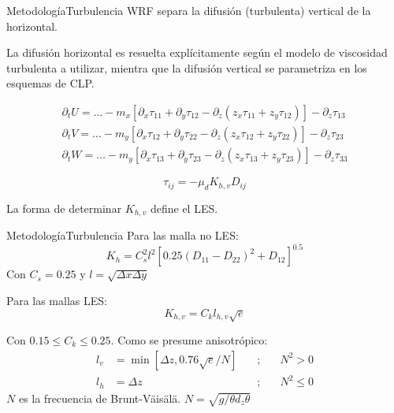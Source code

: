 \documentclass[mathserif]{beamer}
\begin{document}
\begin{frame}{Metodología}{Turbulencia}
WRF separa la difusión (turbulenta) vertical de la horizontal. 

La difusión horizontal es resuelta explícitamente según el modelo de viscosidad turbulenta a utilizar, mientra que la difusión vertical se parametriza en los esquemas de CLP.

{\small
\begin{eqnarray}
\partial_t U = \ldots - m_x[\partial_x\tau_{11}+\partial_y\tau_{12}-\partial_z(z_x\tau_{11}+z_y\tau_{12})]-\partial_z\tau_{13} \\
\partial_t V = \ldots - m_y[\partial_x\tau_{12}+\partial_y\tau_{22}-\partial_z(z_x\tau_{12}+z_y\tau_{22})]-\partial_z\tau_{23} \\
\partial_t W = \ldots - m_y[\partial_x\tau_{13}+\partial_y\tau_{23}-\partial_z(z_x\tau_{13}+z_y\tau_{23})]-\partial_z\tau_{33}
\end{eqnarray}}

\begin{equation}
\tau_{ij} = -\mu_d K_{h,v}D_{ij}
\end{equation}

La forma de determinar $K_{h,v}$ define el LES.
\end{frame}

\begin{frame}{Metodología}{Turbulencia}
Para las malla no LES:
\begin{equation}
K_h = C_s^2 l^2[0.25(D_{11}-D_{22})^2+D_{12}]^{0.5}
\end{equation}
Con $C_s=0.25$ y $l=\sqrt{\Delta x\Delta y}$

\bigskip
Para las mallas LES:
\begin{equation}
K_{h,v} = C_k l_{h,v}\sqrt{e}
\end{equation}

Con $0.15\leq C_k \leq 0.25$. Como se presume anisotrópico:
\begin{align}
l_v &= \min[\Delta z, 0.76\sqrt{e}/N]\quad&;&\quad N^2>0\\
l_h &= \Delta z\quad&;&\quad N^2\leq 0
\end{align}
$N$ es la frecuencia de Brunt-Väisälä. $N=\sqrt{g/\theta d_z\theta}$
\end{frame}
\end{document}
